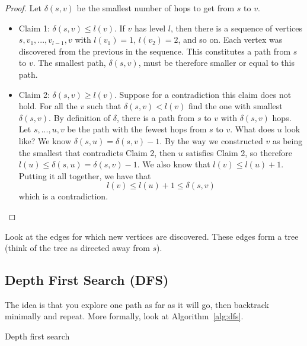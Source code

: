 \begin{proof}
    Let $\delta(s, v)$ be the smallest number of hops to get from $s$
    to $v$.
    \begin{itemize}
        \item Claim 1: $\delta(s, v) \leq l(v)$. If $v$ has level $l$,
        then there is a sequence of vertices $s, v_1, ..., v_{l-1}, v$
        with $l(v_1) = 1$, $l(v_2) = 2$, and so on. Each vertex was
        discovered from the previous in the sequence. This constitutes
        a path from $s$ to $v$. The smallest path, $\delta(s, v)$,
        must be therefore smaller or equal to this path.
        \item Claim 2: $\delta(s, v) \geq l(v)$. Suppose for a
        contradiction this claim does not hold. For all the $v$ such
        that
        $\delta(s, v) < l(v)$ find the one with smallest $\delta(s,
        v)$. By definition of $\delta$, there is a path from $s$ to
        $v$ with $\delta(s, v)$ hops. Let $s, ..., u, v$ be the path
        with the fewest hops from $s$ to $v$. What does $u$ look like?
        We know $\delta(s, u) = \delta(s, v) - 1$. By the way we
        constructed
        $v$ as being the smallest that contradicts Claim 2, then $u$
        satisfies Claim 2, so therefore $l(u) \leq
        \delta(s, u) = \delta(s, v) - 1$.
        We also know that $l(v) \leq l(u) + 1$. Putting it all
        together, we have that
        $$
        l(v) \leq l(u) + 1 \leq \delta(s, v)
        $$
        which is a contradiction.
    \end{itemize}
\end{proof}

\begin{remark}
    Look at the edges for which new vertices are discovered. These 
edges form a tree (think of the tree as directed away from $s$).
\end{remark}

\subsection{Depth First Search (DFS)}

The idea is that you explore one path as far as it will go, then
backtrack minimally and repeat. More formally, look at
Algorithm~\ref{alg:dfs}.


\begin{algorithm}
\caption{Depth first search}
\begin{algorithmic}
\ENDIF
\ENDFOR
\end{algorithmic}
\label{alg:dfs}
\end{algorithm}

